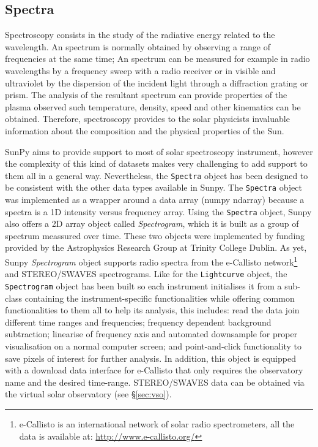 \subsection{Spectra}\label{sec:spectra}

Spectroscopy consists in the study of the radiative energy related to the wavelength.
An spectrum is normally obtained by observing a range of frequencies at the same time; 
An spectrum can be measured for example in radio wavelengths by a frequency sweep with 
a radio receiver or in visible and ultraviolet by the dispersion of the incident light 
through a diffraction grating or prism.
The analysis of the resultant spectrum can provide properties of the plasma observed 
such temperature, density, speed and other kinematics can be obtained. 
Therefore, spectroscopy provides to the solar physicists invaluable information about 
the composition and the physical properties of the Sun.  

SunPy aims to provide support to most of solar spectroscopy instrument, however the 
complexity of this kind of datasets makes very challenging to add support to them all 
in a general way.  
Nevertheless, the \texttt{Spectra} object has been designed to be consistent with the 
other data types available in Sunpy.
The \texttt{Spectra} object was implemented as a wrapper around a data array (numpy ndarray)
because a spectra is a 1D intensity versus frequency array.
Using the \texttt{Spectra} object, Sunpy also offers a 2D array object called \textit{Spectrogram},
which it is built as a group of spectrum meassured over time.
These two objects were implemented by funding provided by the Astrophysics Research 
Group at Trinity College Dublin.
As yet, Sunpy \textit{Spectrogram} object supports radio spectra from the e-Callisto 
network\footnote{e-Callisto is an international network of solar radio spectrometers, 
                 all the data is available at: \url{http://www.e-callisto.org/} } 
and STEREO/SWAVES spectrograms.
Like for the \texttt{Lightcurve} object, the \texttt{Spectrogram} object has been
built so each instrument initialises it from a sub-class containing the instrument-specific 
functionalities while offering common functionalities to them all to help its analysis, 
this includes:
read the data %
join different time ranges and frequencies; 
frequency dependent background subtraction;  
linearise of frequency axis and automated downsample for proper visualisation on a normal computer screen;  
and point-and-click functionality to save pixels of interest for further analysis.
In addition, this object is equipped with a download data interface for e-Callisto that 
only requires the observatory name and the desired time-range. 
STEREO/SWAVES data can be obtained via the virtual solar observatory (see \S\ref{sec:vso}).

